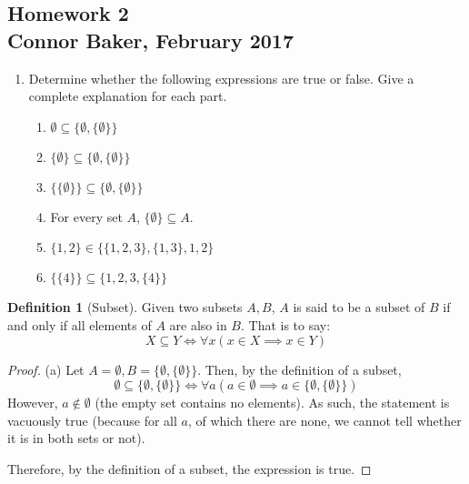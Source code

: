 \documentclass[10pt]{article}
\theoremstyle{definition}
\newtheorem{definition}[equation]{Definition}
\theoremstyle{plain}
\begin{document}
\begin{center}
  \subsection*{Homework 2\\Connor Baker, February 2017}
\end{center}

\begin{enumerate}
\item Determine whether the following expressions are true or false.  Give a complete explanation for each part.
  \begin{enumerate}
  \item $\emptyset \subseteq \{\emptyset, \{ \emptyset \} \}$
  \item $\{\emptyset\} \subseteq \{\emptyset, \{ \emptyset \} \}$
  \item $\{\{\emptyset\}\} \subseteq \{\emptyset, \{ \emptyset \} \}$
  \item For every set $A$, $\{\emptyset\} \subseteq A.$
  \item $\{1,2\} \in \{\{1,2,3\},\{1,3\}, 1, 2\}$
  \item $\{\{4\}\} \subseteq \{1,2,3,\{4\}\}$
  \end{enumerate}
\end{enumerate}

\begin{definition}[Subset]
  Given two subsets $A,B$, $A$ is said to be a subset of $B$ if and only if all elements of $A$ are also in $B$. That is to say:
  \begin{equation*}
    X \subseteq Y \iff \forall x(x\in X \implies x\in Y)
  \end{equation*}
\end{definition}

\begin{proof}{(a)}
  Let $A=\emptyset, B = \{\emptyset,\{\emptyset\}\}$. Then, by the definition of a subset,
  \begin{equation*}
    \emptyset \subseteq \{\emptyset,\{\emptyset\}\} \iff \forall a(a\in \emptyset \implies a\in \{\emptyset,\{\emptyset\}\})
  \end{equation*}
  However, $a\not\in\emptyset$ (the empty set contains no elements). As such, the statement is vacuously true (because for all $a$, of which there are none, we cannot tell whether it is in both sets or not). \\

  \par Therefore, by the definition of a subset, the expression is true.
\end{proof}
\end{document}
